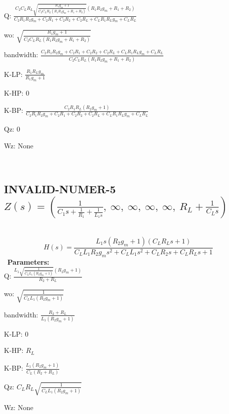\documentclass{article}
\begin{document}
Q: $\frac{C_{2} C_{L} R_{L} \sqrt{\frac{R_{1} g_{m} + 1}{C_{2} C_{L} R_{L} \left(R_{1} R_{2} g_{m} + R_{1} + R_{2}\right)}} \left(R_{1} R_{2} g_{m} + R_{1} + R_{2}\right)}{C_{2} R_{1} R_{2} g_{m} + C_{2} R_{1} + C_{2} R_{2} + C_{2} R_{L} + C_{L} R_{1} R_{L} g_{m} + C_{L} R_{L}}$\ 

wo: $\sqrt{\frac{R_{1} g_{m} + 1}{C_{2} C_{L} R_{L} \left(R_{1} R_{2} g_{m} + R_{1} + R_{2}\right)}}$\ 

bandwidth: $\frac{C_{2} R_{1} R_{2} g_{m} + C_{2} R_{1} + C_{2} R_{2} + C_{2} R_{L} + C_{L} R_{1} R_{L} g_{m} + C_{L} R_{L}}{C_{2} C_{L} R_{L} \left(R_{1} R_{2} g_{m} + R_{1} + R_{2}\right)}$\ 

K-LP: $\frac{R_{1} R_{L} g_{m}}{R_{1} g_{m} + 1}$\ 

K-HP: $0$\ 

K-BP: $\frac{C_{2} R_{1} R_{L} \left(R_{2} g_{m} + 1\right)}{C_{2} R_{1} R_{2} g_{m} + C_{2} R_{1} + C_{2} R_{2} + C_{2} R_{L} + C_{L} R_{1} R_{L} g_{m} + C_{L} R_{L}}$\ 

Qz: $0$\ 

Wz: $\text{None}$\ 

\ 

\subsection{INVALID-NUMER-5 $Z(s) = \left( \frac{1}{C_{1} s + \frac{1}{R_{1}} + \frac{1}{L_{1} s}}, \  \infty, \  \infty, \  \infty, \  \infty, \  R_{L} + \frac{1}{C_{L} s}\right)$ } \ 
\textbf{\[H(s) = \frac{L_{1} s \left(R_{2} g_{m} + 1\right) \left(C_{L} R_{L} s + 1\right)}{C_{L} L_{1} R_{2} g_{m} s^{2} + C_{L} L_{1} s^{2} + C_{L} R_{2} s + C_{L} R_{L} s + 1}\] } \ 
\textbf{Parameters:}\\ 

Q: $\frac{L_{1} \sqrt{\frac{1}{C_{L} L_{1} \left(R_{2} g_{m} + 1\right)}} \left(R_{2} g_{m} + 1\right)}{R_{2} + R_{L}}$\ 

wo: $\sqrt{\frac{1}{C_{L} L_{1} \left(R_{2} g_{m} + 1\right)}}$\ 

bandwidth: $\frac{R_{2} + R_{L}}{L_{1} \left(R_{2} g_{m} + 1\right)}$\ 

K-LP: $0$\ 

K-HP: $R_{L}$\ 

K-BP: $\frac{L_{1} \left(R_{2} g_{m} + 1\right)}{C_{L} \left(R_{2} + R_{L}\right)}$\ 

Qz: $C_{L} R_{L} \sqrt{\frac{1}{C_{L} L_{1} \left(R_{2} g_{m} + 1\right)}}$\ 

Wz: $\text{None}$\ 
\end{document}
